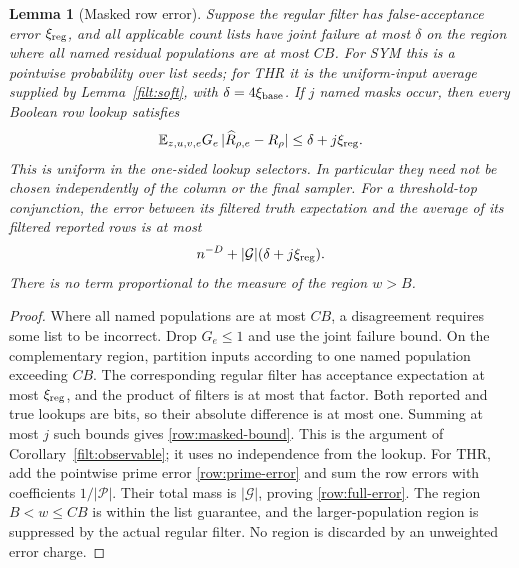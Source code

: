 \documentclass[11pt,letterpaper]{article}
\newtheorem{lemma}[theorem]{Lemma}
\theoremstyle{definition}
\theoremstyle{remark}
\begin{document}
\begin{lemma}[Masked row error]
\label{row:masked-error}
Suppose the regular filter has false-acceptance error $\xi_{\rm reg}$,
and all applicable count lists have joint failure at most $\delta$
on the region where all named residual populations are at most $CB$.
For SYM this is a pointwise probability over list seeds; for THR it is
the uniform-input average supplied by Lemma~\ref{filt:soft}, with
$\delta=4\xi_{\rm base}$.  If $j$ named masks occur, then every
Boolean row lookup satisfies
\begin{equation}
 \mathbb E_{z,u,v,e}G_e\,|\widehat R_{\rho,e}-R_\rho|
 \le\delta+j\xi_{\rm reg}.
 \label{row:masked-bound}
\end{equation}
This is uniform in the one-sided lookup selectors.  In particular they
need not be chosen independently of the column or the final sampler.
For a threshold-top conjunction, the error between its filtered truth
expectation and the average of its filtered reported rows is at most
\begin{equation}
 n^{-D}+|\mathcal G|(\delta+j\xi_{\rm reg}).
 \label{row:full-error}
\end{equation}
There is no term proportional to the measure of the region $w>B$.
\end{lemma}

\begin{proof}
Where all named populations are at most $CB$, a disagreement requires
some list to be incorrect.  Drop $G_e\le1$ and use the joint failure
bound.  On the complementary region, partition inputs according to
one named population exceeding $CB$.  The corresponding regular
filter has acceptance expectation at most $\xi_{\rm reg}$, and the
product of filters is at most that factor.  Both reported and true
lookups are bits, so their absolute difference is at most one.
Summing at most $j$ such bounds gives \eqref{row:masked-bound}.
This is the argument of Corollary~\ref{filt:observable}; it uses no
independence from the lookup.  For THR, add the pointwise prime error
\eqref{row:prime-error} and sum the row errors with coefficients
$1/|\mathcal P|$.  Their total mass is $|\mathcal G|$, proving
\eqref{row:full-error}.  The region $B<w\le CB$ is within the list
guarantee, and the larger-population region is suppressed by the actual
regular filter.  No region is discarded by an unweighted error charge.
\end{proof}
\end{document}
